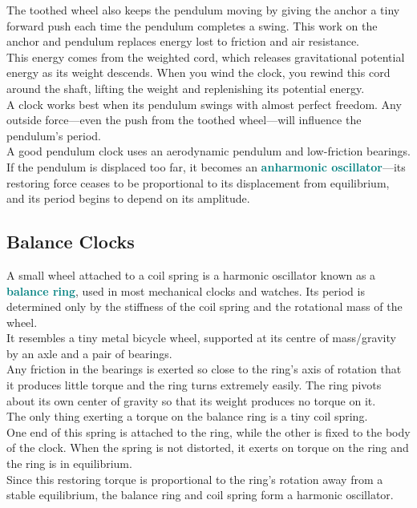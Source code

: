 \documentclass[12pt]{article}
\theoremstyle{definition}
\newcommand{\defnterm}[1]{\textbf{\textcolor{teal}{#1}}\index{#1}}
\begin{document}
The toothed wheel also keeps the pendulum moving by giving the anchor a tiny forward push each time the pendulum completes a swing.
This work on the anchor and pendulum replaces energy lost to friction and air resistance. \\
This energy comes from the weighted cord, which releases gravitational potential energy as its weight descends.
When you wind the clock, you rewind this cord around the shaft, lifting the weight and replenishing its potential energy. \\

A clock works best when its pendulum swings with almost perfect freedom.
Any outside force---even the push from the toothed wheel---will influence the pendulum's period. \\
A good pendulum clock uses an aerodynamic pendulum and low-friction bearings. \\

If the pendulum is displaced too far, it becomes an \defnterm{anharmonic oscillator}---its restoring force ceases to be proportional to its displacement from equilibrium, and its period begins to depend on its amplitude.

\subsection{Balance Clocks}
A small wheel attached to a coil spring is a harmonic oscillator known as a \defnterm{balance ring}, used in most mechanical clocks and watches.
Its period is determined only by the stiffness of the coil spring and the rotational mass of the wheel. \\
It resembles a tiny metal bicycle wheel, supported at its centre of mass/gravity by an axle and a pair of bearings. \\
Any friction in the bearings is exerted so close to the ring's axis of rotation that it produces little torque and the ring turns extremely easily.
The ring pivots about its own center of gravity so that its weight produces no torque on it. \\

The only thing exerting a torque on the balance ring is a tiny coil spring. \\
One end of this spring is attached to the ring, while the other is fixed to the body of the clock.
When the spring is not distorted, it exerts on torque on the ring and the ring is in equilibrium.\\
Since this restoring torque is proportional to the ring's rotation away from a stable equilibrium, the balance ring and coil spring form a harmonic oscillator. \\
\end{document}
